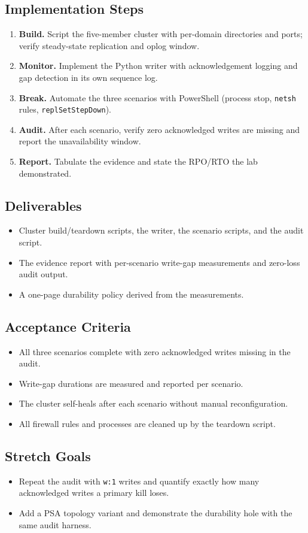 \subsection*{Implementation Steps}
\begin{enumerate}
    \item \textbf{Build.} Script the five-member cluster with per-domain directories and ports; verify steady-state replication and oplog window.
    \item \textbf{Monitor.} Implement the Python writer with acknowledgement logging and gap detection in its own sequence log.
    \item \textbf{Break.} Automate the three scenarios with PowerShell (process stop, \texttt{netsh} rules, \texttt{replSetStepDown}).
    \item \textbf{Audit.} After each scenario, verify zero acknowledged writes are missing and report the unavailability window.
    \item \textbf{Report.} Tabulate the evidence and state the RPO/RTO the lab demonstrated.
\end{enumerate}

\subsection*{Deliverables}
\begin{itemize}
    \item Cluster build/teardown scripts, the writer, the scenario scripts, and the audit script.
    \item The evidence report with per-scenario write-gap measurements and zero-loss audit output.
    \item A one-page durability policy derived from the measurements.
\end{itemize}

\subsection*{Acceptance Criteria}
\begin{itemize}
    \item All three scenarios complete with zero acknowledged writes missing in the audit.
    \item Write-gap durations are measured and reported per scenario.
    \item The cluster self-heals after each scenario without manual reconfiguration.
    \item All firewall rules and processes are cleaned up by the teardown script.
\end{itemize}

\subsection*{Stretch Goals}
\begin{itemize}
    \item Repeat the audit with \texttt{w:1} writes and quantify exactly how many acknowledged writes a primary kill loses.
    \item Add a PSA topology variant and demonstrate the durability hole with the same audit harness.
\end{itemize}
